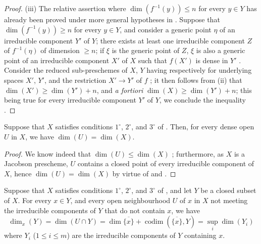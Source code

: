 \begin{proof}
(iii) The relative assertion where $\dim(f^{-1}(y))\leq n$ for every $y\in Y$ has already been proved under more general hypotheses in .
Suppose that $\dim(f^{-1}(y))\geq n$ for every $y\in Y$, and consider a generic point $\eta$ of an irreducible component $Y'$ of $Y$; there exists at least one irreducible component $Z$ of $f^{-1}(\eta)$ of dimension $\geq n$; if $\xi$ is the generic point of $Z$, $\xi$ is also a generic point of an irreducible component $X'$ of $X$ such that $f(X')$ is dense in $Y'$ .
Consider the reduced sub-preschemes of $X$, $Y$ having respectively for underlying spaces $X'$, $Y'$, and the restriction $X'\to Y'$ of $f$ ; it then follows from (ii) that $\dim(X')\geq\dim(Y')+n$, and \emph{a fortiori} $\dim(X)\geq\dim(Y')+n$; this being true for every irreducible component $Y'$ of $Y$, we conclude the inequality .
\end{proof}

\begin{corollary}[10.6.2]
\label{IV.10.6.2}
Suppose that $X$ satisfies conditions $1^\circ$, $2^\circ$, and $3^\circ$ of .
Then, for every dense open $U$ in $X$, we have $\dim(U)=\dim(X)$.
\end{corollary}

\begin{proof}
We know indeed that $\dim(U)\leq\dim(X)$ ; furthermore, as $X$ is a Jacobson prescheme, $U$ contains a closed point of every irreducible component of $X$, hence $\dim(U)=\dim(X)$ by virtue of  and .
\end{proof}

\begin{proposition}[10.6.3]
\label{IV.10.6.3}
Suppose that $X$ satisfies conditions $1^\circ$, $2^\circ$, and $3^\circ$ of , and let $Y$ be a closed subset of $X$.
For every $x\in Y$, and every open neighbourhood $U$ of $x$ in $X$ not meeting the irreducible components of $Y$ that do not contain $x$, we have
\begin{equation}
\label{IV.10.6.3.1}
\tag{10.6.3.1}
\dim_x(Y)=\dim(U\cap Y)=\dim\overline{\{x\}}+\operatorname{codim}(\overline{\{x\}},Y)=\sup_i\dim(Y_i)
\end{equation}
where $Y_i$ \textup{(}$1\leq i\leq m$\textup{)} are the irreducible components of $Y$ containing $x$.
\end{proposition}

